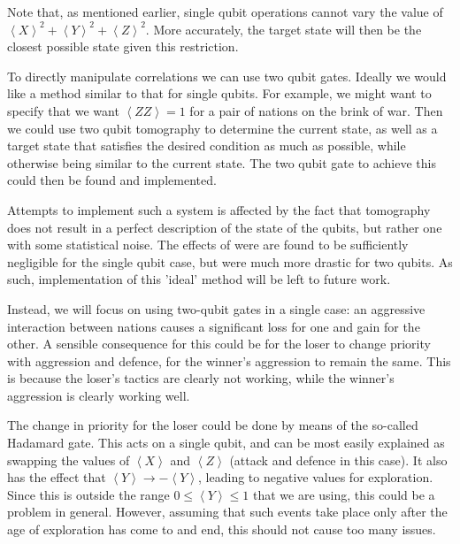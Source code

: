 \documentclass[conference]{IEEEtran}
\begin{document}
Note that, as mentioned earlier, single qubit operations cannot vary the value of $ \left\langle X\right\rangle^2 + \left\langle Y\right\rangle^2 + \left\langle Z\right\rangle^2$. More accurately, the target state will then be the closest possible state given this restriction.

To directly manipulate correlations we can use two qubit gates. Ideally we would like a method similar to that for single qubits. For example, we might want to specify that we want $\left\langle ZZ \right\rangle = 1$ for a pair of nations on the brink of war. Then we could use two qubit tomography to determine the current state, as well as a target state that satisfies the desired condition as much as possible, while otherwise being similar to the current state. The two qubit gate to achieve this could then be found and implemented.

Attempts to implement such a system is affected by the fact that tomography does not result in a perfect description of the state of the qubits, but rather one with some statistical noise. The effects of were are found to be sufficiently negligible for the single qubit case, but were much more drastic for two qubits. As such, implementation of this 'ideal' method will be left to future work.

Instead, we will focus on using two-qubit gates in a single case: an aggressive interaction between nations causes a significant loss for one and gain for the other. A sensible consequence for this could be for the loser to change priority with aggression and defence, for the winner's aggression to remain the same. This is because the loser's tactics are clearly not working, while the winner's aggression is clearly working well.

The change in priority for the loser could be done by means of the so-called Hadamard gate. This acts on a single qubit, and can be most easily explained as swapping the values of $\left\langle X\right\rangle$ and $\left\langle Z\right\rangle$ (attack and defence in this case). It also has the effect that $\left\langle Y\right\rangle \rightarrow -\left\langle Y\right\rangle$, leading to negative values for exploration. Since this is outside the range $0 \leq \left\langle Y\right\rangle \leq 1$ that we are using, this could be a problem in general. However, assuming that such events take place only after the age of exploration has come to and end, this should not cause too many issues.
\end{document}
